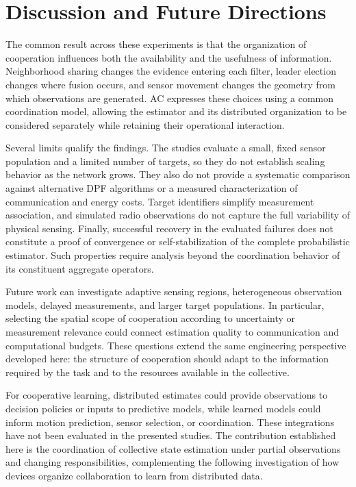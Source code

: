 \section{Discussion and Future Directions}
\label{sec:dpf-discussion}

The common result across these experiments is that the organization of cooperation 
 influences both the availability and the usefulness of information.
%
Neighborhood sharing changes the evidence entering each filter, 
 leader election changes where fusion occurs,
 and sensor movement changes the geometry from which observations are generated.
%
\gls{AC} expresses these choices using a common coordination model, 
 allowing the estimator and its distributed organization to be considered separately 
 while retaining their operational interaction.

Several limits qualify the findings.
%
The studies evaluate a small, 
 fixed sensor population and a limited number of targets, 
 so they do not establish scaling behavior as the network grows.
%
They also do not provide a systematic comparison against alternative \gls{DPF} algorithms 
 or a measured characterization of communication and energy costs.
%
Target identifiers simplify measurement association, 
 and simulated radio observations do not capture the full variability of physical sensing.
%
Finally, 
 successful recovery in the evaluated failures does not constitute a proof of convergence 
 or self-stabilization of the complete probabilistic estimator.
%
Such properties require analysis beyond the coordination behavior 
 of its constituent aggregate operators.

Future work can investigate adaptive sensing regions, 
 heterogeneous observation models, delayed measurements, and larger target populations.
%
In particular, 
 selecting the spatial scope of cooperation according to uncertainty
 or measurement relevance could connect estimation quality to communication and computational budgets.
%
These questions extend the same engineering perspective developed here: 
 the structure of cooperation should adapt to the information required by the task 
 and to the resources available in the collective.

For cooperative learning, 
 distributed estimates could provide observations to decision policies or inputs to predictive models,
 while learned models could inform motion prediction, sensor selection, or coordination.
%
These integrations have not been evaluated in the presented studies.
%
The contribution established here is the coordination 
 of collective state estimation under partial observations and changing responsibilities, 
 complementing the following investigation of how devices organize collaboration to learn from distributed data.